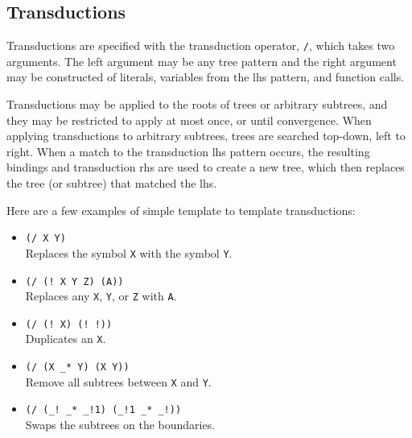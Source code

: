 \documentclass[a4,11pt]{article}
\begin{document}
\subsection*{Transductions}
Transductions are specified with the transduction operator, \texttt{/}, which takes two arguments.  The left argument may be any tree pattern and the right argument may be constructed of literals, variables from the lhs pattern, and function calls.

Transductions may be applied to the roots of trees or arbitrary subtrees, and they may be restricted to apply at most once, or until convergence.  When applying transductions to arbitrary subtrees, trees are searched top-down, left to right.  When a match to the transduction lhs pattern occurs, the resulting bindings and transduction rhs are used to create a new tree, which then replaces the tree (or subtree) that matched the lhs. 

Here are a few examples of simple template to template transductions:
\begin {itemize}
\item  \texttt{(/ X Y)}\\Replaces the symbol \texttt{X} with the symbol \texttt{Y}.
\item  \texttt{(/ (!~X Y Z) (A))}\\Replaces any \texttt{X}, \texttt{Y}, or \texttt{Z} with \texttt{A}.
\item  \texttt{(/ (!~X) (!~!))}\\Duplicates an \texttt{X}.
\item  \texttt{(/ (X \_* Y) (X Y))}\\Remove all subtrees between \texttt{X} and \texttt{Y}.
\item  \texttt{(/ (\_!~\_* \_!1) (\_!1 \_* \_!))}\\Swaps the subtrees on the boundaries.
\end {itemize}
\end{document}
